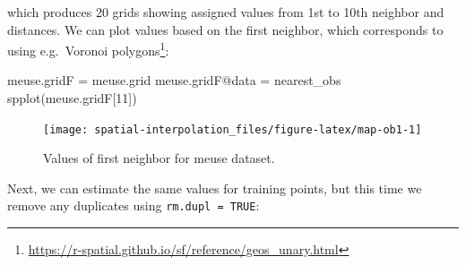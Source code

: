 \documentclass[
  graybox,natbib,nospthms]{svmono}
\newenvironment{Shaded}{\begin{snugshade}}{\end{snugshade}}
\newcommand{\CommentTok}[1]{\textcolor[rgb]{0.37,0.37,0.37}{\textit{#1}}}
\newcommand{\DecValTok}[1]{\textcolor[rgb]{0.06,0.06,0.06}{#1}}
\newcommand{\FunctionTok}[1]{\textcolor[rgb]{0,0,0}{#1}}
\newcommand{\NormalTok}[1]{#1}
\newcommand{\OtherTok}[1]{\textcolor[rgb]{0.37,0.37,0.37}{#1}}
\newcommand{\SpecialCharTok}[1]{\textcolor[rgb]{0,0,0}{#1}}
\renewcommand{\href}[2]{#2 (\url{#1})}
\renewcommand{\href}[2]{#2\footnote{\url{#1}}}
\begin{document}
\begin{Shaded}
\end{Shaded}

which produces 20 grids showing assigned values from 1st to 10th
neighbor and distances. We can plot values based on the first neighbor,
which corresponds to using e.g.~\href{https://r-spatial.github.io/sf/reference/geos_unary.html}{Voronoi polygons}:

\begin{Shaded}
\begin{Highlighting}[]
\NormalTok{meuse.gridF }\OtherTok{=}\NormalTok{ meuse.grid}
\NormalTok{meuse.gridF}\SpecialCharTok{@}\NormalTok{data }\OtherTok{=}\NormalTok{ nearest\_obs}
\FunctionTok{spplot}\NormalTok{(meuse.gridF[}\DecValTok{11}\NormalTok{])}
\end{Highlighting}
\end{Shaded}

\begin{figure}

{\centering \texttt{[image: spatial-interpolation\_files/figure-latex/map-ob1-1]} 

}

\caption{Values of first neighbor for meuse dataset.}\label{fig:map-ob1}
\end{figure}

Next, we can estimate the same values for training points, but this time
we remove any duplicates using \texttt{rm.dupl\ =\ TRUE}:
\end{document}
